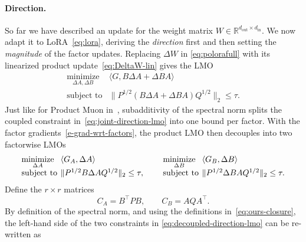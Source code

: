 \documentclass[11pt]{article}
\newcommand{\R}{\mathbb{R}}
\newcommand{\ip}[1]{\langle #1 \rangle}
\newcommand{\norm}[1]{\| #1\|}
\theoremstyle{plain}
\theoremstyle{definition}
\theoremstyle{remark}
\theoremstyle{definition}
\begin{document}
\paragraph{Direction.}
So far we have described an update for the weight matrix $W \in \R^{d_{\mathrm{out}} \times d_{\mathrm{in}}}$. We now adapt it to LoRA~\eqref{eq:lora}, deriving the \emph{direction} first and then setting the \emph{magnitude} of the factor updates. Replacing $\Delta W$ in \eqref{eq:polorafull} with its linearized product update~\eqref{eq:DeltaW-lin} gives the LMO
\begin{equation}
    \begin{array}{ll}
    \underset{\Delta A,\Delta B}{\mathrm{minimize}} &
    \ip{G, B\Delta A+\Delta B A} \\[2pt]
    \mbox{subject to} &
    \norm{P^{1/2}(B\Delta A+\Delta B A)Q^{1/2}}_2
    \le \tau.
    \end{array}
    \label{eq:joint-direction-lmo}
  \end{equation}
Just like for Product Muon in~, subadditivity of the spectral norm splits the coupled constraint in~\eqref{eq:joint-direction-lmo} into one bound per factor. With the factor gradients~\eqref{e-grad-wrt-factors}, the product LMO then decouples into two factorwise LMOs
\begin{equation}
\setlength{\arraycolsep}{2pt}
\begin{array}{@{}c@{\qquad}c@{}}
\begin{array}{ll}
\underset{\Delta A}{\mathrm{minimize}} &
\ip{G_A,\Delta A} \\[2pt]
\mbox{subject to} &
\norm{P^{1/2}B\Delta A Q^{1/2}}_2 \le \tau ,
\end{array}
&
\begin{array}{ll}
\underset{\Delta B}{\mathrm{minimize}} &
\ip{G_B,\Delta B} \\[2pt]
\mbox{subject to} &
\norm{P^{1/2}\Delta B A Q^{1/2}}_2 \le \tau .
\end{array}
\end{array}
\label{eq:decoupled-direction-lmo}
\end{equation}
Define the $r\times r$ matrices
\begin{equation}
C_A = B^\top P B,
\qquad
C_B = A Q A^\top .
\label{eq:ours-closure}
\end{equation}
By definition of the spectral norm, and using the definitions in~\eqref{eq:ours-closure}, the left-hand side of the two constraints in \eqref{eq:decoupled-direction-lmo} can be re-written as
\end{document}
